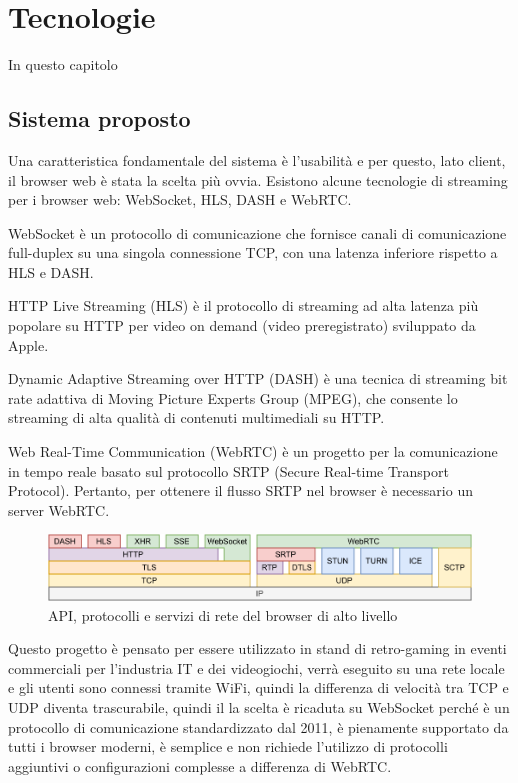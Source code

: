 %
%
\chapter{Tecnologie}

In questo capitolo 

\section{Sistema proposto}
Una caratteristica fondamentale del sistema è l'usabilità e per questo, lato client, il browser web è stata la scelta più ovvia.
Esistono alcune tecnologie di streaming per i browser web: WebSocket, HLS, DASH e WebRTC\cite{Audio_and_video_delivery}.

WebSocket è un protocollo di comunicazione che fornisce canali di comunicazione full-duplex su una singola connessione TCP, con una latenza inferiore rispetto a HLS e DASH.

HTTP Live Streaming (HLS) è il protocollo di streaming ad alta latenza più popolare su HTTP per video on demand (video preregistrato) sviluppato da Apple.

Dynamic Adaptive Streaming over HTTP (DASH) è una tecnica di streaming bit rate adattiva di Moving Picture Experts Group (MPEG), che consente lo streaming di alta qualità di contenuti multimediali su HTTP.

Web Real-Time Communication (WebRTC) è un progetto per la comunicazione in tempo reale basato sul protocollo SRTP (Secure Real-time Transport Protocol). Pertanto, per ottenere il flusso SRTP nel browser è necessario un server WebRTC\cite{High_Performance_Browser_Networking}.

\begin{figure}[H]
	\includegraphics[width=\linewidth]{immagini/webprotocols}
	\caption{API, protocolli e servizi di rete del browser di alto livello}
	\label{fig:webprotocols}
\end{figure}

Questo progetto è pensato per essere utilizzato in stand di retro-gaming in eventi commerciali per l'industria IT e dei videogiochi, verrà eseguito su una rete locale e gli utenti sono connessi tramite WiFi, quindi la differenza di velocità tra TCP e UDP diventa trascurabile, quindi il la scelta è ricaduta su WebSocket perché è un protocollo di comunicazione standardizzato dal 2011, è pienamente supportato da tutti i browser moderni, è semplice e non richiede l'utilizzo di protocolli aggiuntivi o configurazioni complesse a differenza di WebRTC.

